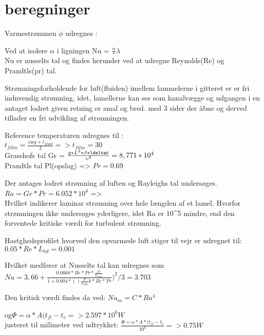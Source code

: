\section{beregninger}

Varmestrømmen $\phi$ udregnes : 

Ved at isolere $\alpha$ i ligningen Nu = $\frac{\alpha}*{\lambda}$ \\
Nu er nusselts tal og findes herunder ved at udregne Reynolds(Re) og Prandtls(pr) tal.


Strømningsforholdende for luft(fluiden) imellem lammelerne i gitteret er er fri indnvendig strømning, idet, lamellerne kan ses som kanalvægge og udgangen i en antaget lodret given retning er smal og bred. med 3 sider der åbne og derved tillader en fri udvikling af strømningen. 

Reference temperaturen udregnes til : 
\\$t_{film} = \frac{{væg}+t_{fluid}}{2} => t_{film}=30$
\\Grasshofs tal Gr = $\frac{g*L^3*\beta*{\deltat}}{\upsilon^2} = 8,771*10^4$
\\Prandtls tal Pl(opslag) => $Pr=0.69$


Der antages lodret  strømning af luften og Rayleighs tal undersøges.\\
$ Ra = Gr*Pr = 6.052*10^4$ => \\ 
Hvilket indikerer laminar strømning over hele længden af et lamel. Hvorfor strømningen ikke undersøges yderligere, idet Ra er 10^5 mindre, end den forventede kritiske værdi for turbulent strømning.

Hastghedsprofilet hvorved den opvarmede luft stiger til vejr er udregnet til: 
$0.05*Re*L_{hd} = 0.001 $

Hvilket medfører at Nusselts tal kan udregnes som \\ 
$Nu = 3,66+ \frac{0.0668*Re*Pr*\frac{D}{L_{lam}}}{1+0.004*()\frac{D}{L_{lam}}k *Re*Pr})^2/3 = 3.703$


Den kritisk værdi findes da ved: $Nu_m = C*Ra^4$

og$ \Phi = \alpha*A(t_{fl}-t_v =>2.597*10^6 W $\\ 
justeret til milimeter ved udtrykket: $\frac{\Phi = \alpha*A*(t_{fl}-t_v}{10^6} =>0.75 W$
